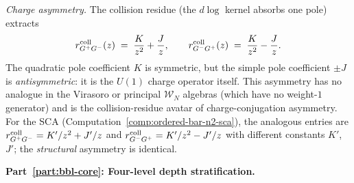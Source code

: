 \begin{computation}[The ordered bar complex of the
Bershadsky--Polyakov algebra
$\mathcal{B}^{k'} = W_{k'}(\mathfrak{sl}_3,f_{\min})$;
\ClaimStatusProvedHere]
\emph{Charge asymmetry.}
The collision residue (the $d\log$ kernel absorbs
one pole) extracts
\begin{equation}\label{eq:bp-collision-residue-asymmetry}
r^{\mathrm{coll}}_{G^+G^-}(z)
\;=\;
\frac{K}{z^2} + \frac{J}{z},
\qquad
r^{\mathrm{coll}}_{G^-G^+}(z)
\;=\;
\frac{K}{z^2} - \frac{J}{z}.
\end{equation}
The quadratic pole coefficient $K$ is symmetric, but the
simple pole coefficient $\pm J$ is \emph{antisymmetric}:
it is the $U(1)$ charge operator itself. This asymmetry
has no analogue in the Virasoro or principal $\mathcal{W}_N$
algebras (which have no weight-$1$ generator) and is the
collision-residue avatar of charge-conjugation asymmetry.
For the SCA (Computation~\ref{comp:ordered-bar-n2-sca}),
the analogous entries are
$r^{\mathrm{coll}}_{G^+G^-}=K'/z^2+J'/z$ and
$r^{\mathrm{coll}}_{G^-G^+}=K'/z^2-J'/z$ with
different constants $K'$, $J'$; the \emph{structural}
asymmetry is identical.

\medskip
\noindent\textbf{Part~\ref{part:bbl-core}: Four-level depth stratification.}


\end{computation}
